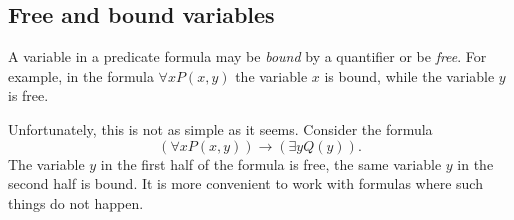 

\setcounter{section}{1}
\setcounter{subsection}{2}
\setcounter{dfn}{4}

\subsection{Free and bound variables}
A variable in a predicate formula may be \emph{bound} by a quantifier or be \emph{free}.
For example, in the formula $\forall x P(x,y)$ the variable $x$ is bound, while the variable $y$ is free.

Unfortunately, this is not as simple as it seems.
Consider the formula
\[
(\forall x P(x,y)) \to (\exists y Q(y)).
\]
The variable $y$ in the first half of the formula is free, the same variable $y$ in the second half is bound.
It is more convenient to work with formulas where such things do not happen.


